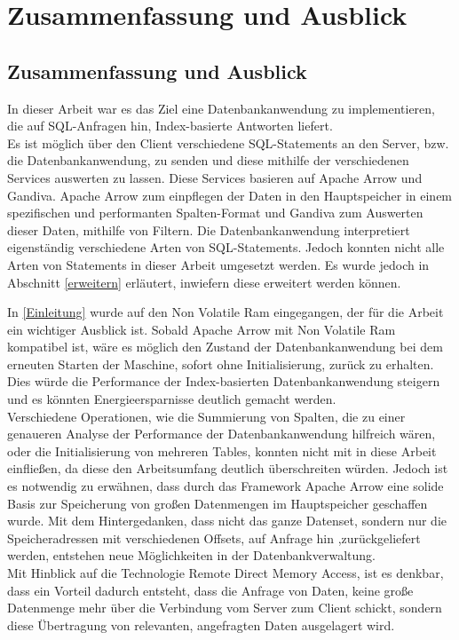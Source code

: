 \chapter{Zusammenfassung und Ausblick}
\label{Zusammenfassung}

\section{Zusammenfassung und Ausblick}

In dieser Arbeit war es das Ziel eine Datenbankanwendung zu implementieren, die auf SQL-Anfragen hin, Index-basierte Antworten liefert. \\
Es ist möglich über den Client verschiedene SQL-Statements an den Server, bzw. die Datenbankanwendung, zu senden und diese mithilfe der verschiedenen Services auswerten zu lassen. 
Diese Services basieren auf Apache Arrow und Gandiva. Apache Arrow zum einpflegen der Daten in den Hauptspeicher in einem spezifischen und performanten Spalten-Format und Gandiva zum Auswerten dieser Daten, mithilfe von Filtern. 
Die Datenbankanwendung interpretiert eigenständig verschiedene Arten von SQL-Statements. Jedoch konnten nicht alle Arten von Statements in dieser Arbeit umgesetzt werden. 
Es wurde jedoch in Abschnitt \ref{erweitern} erläutert, inwiefern diese erweitert werden können.

In \ref{Einleitung} wurde auf den Non Volatile Ram eingegangen, der für die Arbeit ein wichtiger Ausblick ist. 
Sobald Apache Arrow mit Non Volatile Ram kompatibel ist, wäre es möglich den Zustand der Datenbankanwendung bei dem erneuten Starten der Maschine, sofort ohne Initialisierung, zurück zu erhalten. Dies würde die Performance der Index-basierten Datenbankanwendung  steigern und es könnten Energieersparnisse deutlich gemacht werden.
\\
Verschiedene Operationen, wie die Summierung von Spalten, die zu einer genaueren Analyse der Performance der Datenbankanwendung hilfreich wären, oder die Initialisierung von mehreren Tables, konnten nicht mit in diese Arbeit einfließen, da diese den Arbeitsumfang deutlich überschreiten würden. Jedoch ist es notwendig zu erwähnen, dass durch das Framework Apache Arrow eine solide Basis zur Speicherung von großen Datenmengen im Hauptspeicher geschaffen wurde.
Mit dem Hintergedanken, dass nicht das ganze Datenset, sondern nur die Speicheradressen mit verschiedenen Offsets, auf Anfrage hin ,zurückgeliefert werden, entstehen neue Möglichkeiten in der Datenbankverwaltung.
\\ 
Mit Hinblick auf die Technologie Remote Direct Memory Access, ist es denkbar, dass ein Vorteil dadurch entsteht, dass die Anfrage von Daten, keine große Datenmenge mehr über die Verbindung vom Server zum Client schickt, sondern diese Übertragung von relevanten, angefragten Daten ausgelagert wird.

